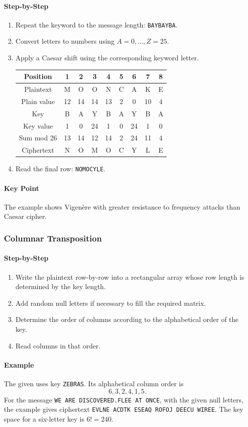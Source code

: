 \documentclass[12pt]{article}
\newcommand{\Step}{\paragraph{Step-by-Step}}
\newcommand{\Example}{\paragraph{Example}}
\newcommand{\KeyPoint}{\paragraph{Key Point}}
\begin{document}
\Step
\begin{enumerate}
    \item Repeat the keyword to the message length:
    \texttt{BAYBAYBA}.
    \item Convert letters to numbers using $A=0,\ldots,Z=25$.
    \item Apply a Caesar shift using the corresponding keyword letter.
    \begin{table}[H]
    \centering
    \small
    \begin{tabular}{c|cccccccc}
    \toprule
    Position & 1&2&3&4&5&6&7&8\\
    \midrule
    Plaintext & M&O&O&N&C&A&K&E\\
    Plain value & 12&14&14&13&2&0&10&4\\
    Key & B&A&Y&B&A&Y&B&A\\
    Key value & 1&0&24&1&0&24&1&0\\
    Sum mod 26 & 13&14&12&14&2&24&11&4\\
    Ciphertext & N&O&M&O&C&Y&L&E\\
    \bottomrule
    \end{tabular}
    \end{table}
    \item Read the final row: \texttt{NOMOCYLE}.
\end{enumerate}

\KeyPoint The example shows Vigen\`ere with greater resistance to frequency attacks than Caesar cipher.

\subsubsection{Columnar Transposition}
\Step
\begin{enumerate}
    \item Write the plaintext row-by-row into a rectangular array whose row length is determined by the key length.
    \item Add random null letters if necessary to fill the required matrix.
    \item Determine the order of columns according to the alphabetical order of the key.
    \item Read columns in that order.
\end{enumerate}
\Example The given uses key \texttt{ZEBRAS}. Its alphabetical column order is
\[
6,3,2,4,1,5.
\]
For the message \texttt{WE ARE DISCOVERED.FLEE AT ONCE}, with the given null letters, the example gives ciphertext \texttt{EVLNE ACDTK ESEAQ ROFOJ DEECU WIREE}. The key space for a six-letter key is $6!=240$.
\end{document}
